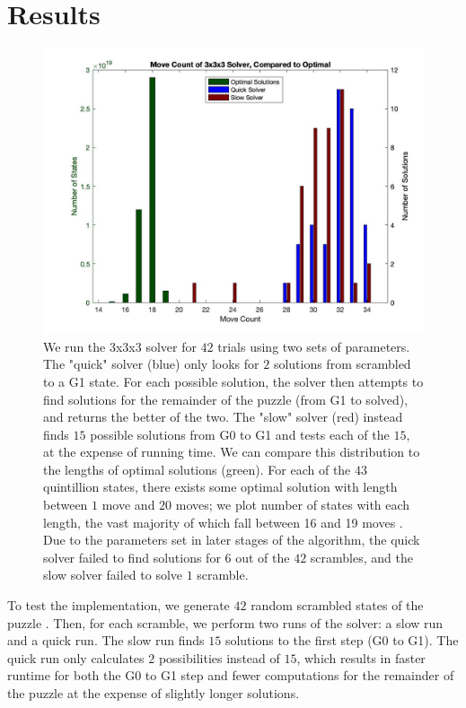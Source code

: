 \documentclass{article}
\begin{document}
\section{Results}
\begin{figure}
	\centering
    \includegraphics[width=5.5in]{movecount.jpg}
	\caption{We run the 3x3x3 solver for $42$ trials using two sets of parameters. The "quick" solver (blue) only looks for $2$ solutions from scrambled to a G1 state. For each possible solution, the solver then attempts to find solutions for the remainder of the puzzle (from G1 to solved), and returns the better of the two. The "slow" solver (red) instead finds $15$ possible solutions from G0 to G1 and tests each of the $15$, at the expense of running time. We can compare this distribution to the lengths of optimal solutions (green). For each of the $43$ quintillion states, there exists some optimal solution with length between $1$ move and $20$ moves; we plot number of states with each length, the vast majority of which fall between 16 and 19 moves \cite{god}. Due to the parameters set in later stages of the algorithm, the quick solver failed to find solutions for $6$ out of the $42$ scrambles, and the slow solver failed to solve $1$ scramble.}
	\label{fig:movecount}
\end{figure}

To test the implementation, we generate $42$ random scrambled states of the puzzle \cite{cstimer}. Then, for each scramble, we perform two runs of the solver: a slow run and a quick run. The slow run finds $15$ solutions to the first step (G0 to G1). The quick run only calculates $2$ possibilities instead of $15$, which results in faster runtime for both the G0 to G1 step and fewer computations for the remainder of the puzzle at the expense of slightly longer solutions.
\end{document}
